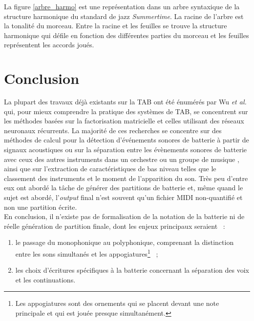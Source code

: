 La figure \ref{arbre_harmo} est une représentation dans un arbre syntaxique de
la structure harmonique du standard de jazz \textit{Summertime}. La racine de l’arbre
est la tonalité du morceau. Entre la racine et les feuilles se trouve la
structure harmonique qui défile en fonction des différentes parties du morceau
et les feuilles représentent les accords joués.

\section*{Conclusion}
La plupart des travaux déjà existants sur la TAB ont été énumérés par Wu
\textit{et al.} \cite{Review_ADT} qui, pour mieux comprendre la pratique des
systèmes de TAB, se concentrent sur les méthodes basées sur la factorisation
matricielle et celles utilisant des réseaux neuronaux récurrents. La majorité
de ces recherches se concentre sur des méthodes de calcul pour la détection
d’événements sonores de batterie à partir de signaux acoustiques ou sur la
séparation entre les évènements sonores de batterie avec ceux des autres
instruments dans un orchestre ou un groupe de musique \cite{2802}, ainsi que
sur l’extraction de caractéristiques de bas niveau telles que le classement des
instruments et le moment de l’apparition du son. Très peu d’entre eux ont
abordé la tâche de générer des partitions de batterie et, même quand le sujet
est abordé, l’\textit{output} final n’est souvent qu’un fichier MIDI
non-quantifié et non une partition écrite.\\

En conclusion, il n’existe pas de formalisation de la notation de la batterie
ni de réelle génération de partition finale, dont les enjeux principaux
seraient~ :
\begin{enumerate}
    \item le passage du monophonique au polyphonique, comprenant la distinction
        entre les sons simultanés et les appogiatures\footnote{Les appogiatures
        sont des ornements qui se placent devant une note principale et qui est
    jouée presque simultanément.}~ ;
    \item les choix d’écritures spécifiques à la batterie concernant la
        séparation des voix et les continuations.
\end{enumerate}

